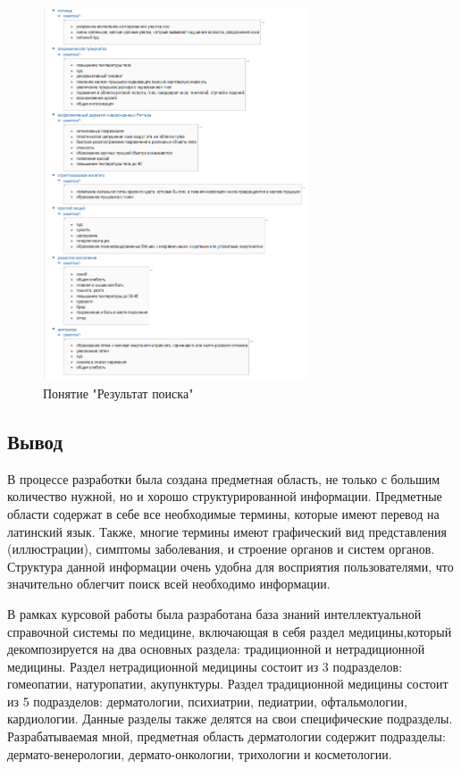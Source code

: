 \begin{figure}[H]
	\centering
	\includegraphics[width=0.7\textwidth]{sections/der1_2.png}
	\caption{Понятие "Результат поиска"}
	\label{fig:sections/der1_2}
\end{figure}

\subsection{Вывод}
В процессе разработки была создана предметная область, не только с большим количество нужной, но и хорошо структурированной информации. Предметные области содержат в себе все необходимые термины, которые имеют перевод на латинский язык. Также, многие термины имеют графический вид представления (иллюстрации), симптомы заболевания, и строение органов и систем органов. Структура данной информации очень удобна для восприятия пользователями, что значительно облегчит поиск всей необходимо информации. 


В рамках курсовой работы была разработана база знаний интеллектуальной справочной системы по медицине, включающая в себя раздел медицины,который декомпозируется на два основных раздела: традиционной и нетрадиционной медицины. Раздел нетрадиционной медицины состоит из 3 подразделов: гомеопатии, натуропатии, акупунктуры.  Раздел традиционной медицины состоит из 5 подразделов: дерматологии, психиатрии, педиатрии, офтальмологии, кардиологии. Данные разделы также делятся на свои специфические подразделы. Разрабатываемая мной, предметная область дерматологии содержит подразделы: дермато-венерологии, дермато-онкологии, трихологии и косметологии.

